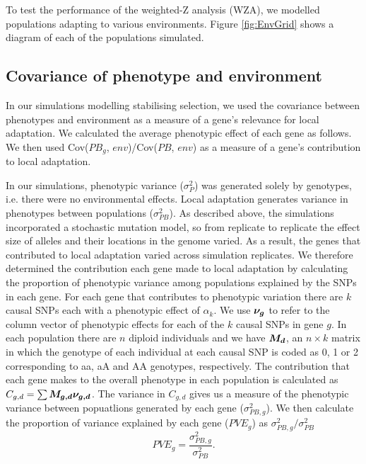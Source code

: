 \documentclass[11pt,twoside,lineno]{GSA_format}
\newcommand{\bm}[1]{\mbox{\boldmath{$#1$}}}
\begin{document}
To test the performance of the weighted-Z analysis (WZA), we modelled populations adapting to various environments. Figure \ref{fig:EnvGrid} shows a diagram of each of the populations simulated.


\subsection{Covariance of phenotype and environment} 

In our simulations modelling stabilising selection, we used the covariance between phenotypes and environment as a measure of a gene's relevance for local adaptation. We calculated the average phenotypic effect of each gene as follows.
We then used Cov($PB_g$, $env$)/Cov($PB$, $env$) as a measure of a gene's contribution to local adaptation.


In our simulations, phenotypic variance ($\sigma^{2}_{P}$) was generated solely by genotypes, i.e. there were no environmental effects. Local adaptation generates variance in phenotypes between populations ($\sigma^{2}_{PB}$). 
As described above, the simulations incorporated a stochastic mutation model, so from replicate to replicate the effect size of alleles and their locations in the genome varied. As a result, the genes that contributed to local adaptation varied across simulation replicates. We therefore determined the contribution  each gene made to local adaptation by calculating the proportion of phenotypic variance among populations explained by the SNPs in each gene. For each gene that contributes to phenotypic variation there are $k$ causal SNPs each with a phenotypic effect of $\alpha_k$. We use $\bm{\nu_g}$ to refer to the column vector of phenotypic effects for each of the $k$ causal SNPs in gene $g$. In each population there are $n$ diploid individuals and we have $\bm{M_d}$, an $n \times k$ matrix in which the genotype of each individual at each causal SNP is coded as 0, 1 or 2 corresponding to aa, aA and AA genotypes, respectively. The contribution that each gene makes to the overall phenotype in each population is calculated as $C_{g,d} = \sum \bm{M_{g,d} \nu_{g,d}}$. The variance in $C_{g,d}$ gives us a measure of the phenotypic variance between popuatlions generated by each gene ($\sigma^{2}_{PB,g}$). We then calculate the proportion of variance explained by each gene ($PVE_g$) as $\sigma^{2}_{PB,g} / \sigma^{2}_{PB}$
\begin{equation}
PVE_g = \frac{\sigma^{2}_{PB,g}}{\sigma^{2}_{PB}}.
\end{equation}
\end{document}
